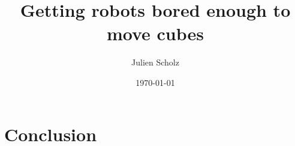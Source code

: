 \documentclass{article}
\title{Getting robots bored enough to move cubes}
\author{Julien Scholz}
\date{\today}
\begin{document}



\tableofcontents






\section{Conclusion}



\end{document}
